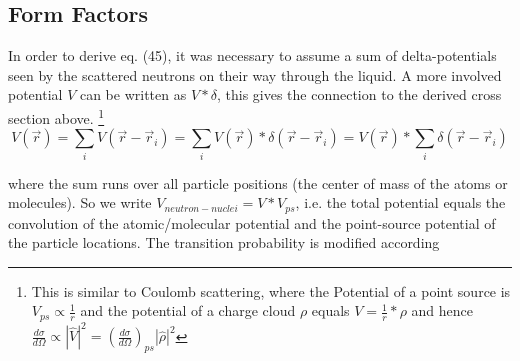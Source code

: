 \documentclass[11pt,a4paper]{article}
\begin{document}
\subsection{Form Factors}
In order to derive eq. (45), it was necessary to assume a sum of delta-potentials seen by the scattered neutrons on their
way through the liquid. A more involved potential $V$ can be written as $V*\delta$, this gives the connection to
the derived cross section above. \footnote{This is similar to Coulomb scattering, where the Potential of a point source is $V_{ps} \propto \frac{1}{r}$
and the potential of a charge cloud $\rho$ equals $V = \frac{1}{r} * \rho $
and hence $\frac{d \sigma} {d\Omega} \propto |\hat V|^2 = (\frac{d \sigma} {d\Omega})_{ps} |\hat \rho|^2$}
\begin{equation}
V(\vec r) = \sum_i V(\vec r - \vec r_i) = 
\sum_i V(\vec r) * \delta(\vec r - \vec r_i) =
V (\vec r) * \sum_i \delta(\vec r - \vec r_i)
\end{equation}

where the sum runs over all particle positions (the center of mass of the atoms or molecules).
So we write $V_{neutron-nuclei} = V*V_{ps}$, i.e. the total potential equals the convolution of the atomic/molecular potential and the
point-source potential of the particle locations. The transition probability is modified according
\end{document}
